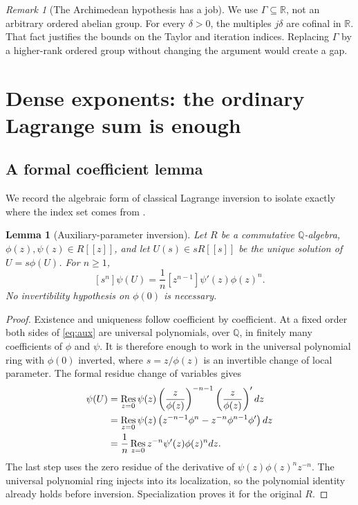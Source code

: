 \documentclass[11pt,a4paper]{article}
\newtheorem{lemma}[theorem]{Lemma}
\theoremstyle{definition}
\theoremstyle{remark}
\newtheorem{remark}[theorem]{Remark}
\newcommand{\R}{\mathbb R}
\newcommand{\Q}{\mathbb Q}
\begin{document}
\begin{remark}[The Archimedean hypothesis has a job]
We use $\Gamma\subseteq\R$, not an arbitrary ordered abelian group. For every
$\delta>0$, the multiples $j\delta$ are cofinal in $\R$. That fact justifies
the bounds on the Taylor and iteration indices. Replacing $\Gamma$ by a
higher-rank ordered group without changing the argument would create a gap.
\end{remark}

\section{Dense exponents: the ordinary Lagrange sum is enough}
\label{sec:LB}

\subsection{A formal coefficient lemma}
We record the algebraic form of classical Lagrange inversion to isolate
exactly where the index set comes from \cite{Gessel}.

\begin{lemma}[Auxiliary-parameter inversion]\label{lem:aux}
Let $R$ be a commutative $\Q$-algebra, $\phi(z),\psi(z)\in R[[z]]$, and let
$U(s)\in sR[[s]]$ be the unique solution of $U=s\phi(U)$. For $n\ge1$,
\begin{equation}\label{eq:aux}
 [s^n]\psi(U)=\frac1n[z^{n-1}]\psi'(z)\phi(z)^n.
\end{equation}
No invertibility hypothesis on $\phi(0)$ is necessary.
\end{lemma}
\begin{proof}
Existence and uniqueness follow coefficient by coefficient. At a fixed
order both sides of \eqref{eq:aux} are universal polynomials, over $\Q$, in
finitely many coefficients of $\phi$ and $\psi$. It is therefore enough to
work in the universal polynomial ring with $\phi(0)$ inverted, where
$s=z/\phi(z)$ is an invertible change of local parameter. The formal residue
change of variables gives
\begin{align*}
 [s^n]\psi(U)
 &=\mathop{\rm Res}_{z=0}
 \psi(z)\left(\frac{z}{\phi(z)}\right)^{-n-1}
 \left(\frac{z}{\phi(z)}\right)' dz\\
 &=\mathop{\rm Res}_{z=0}
 \psi(z)\left(z^{-n-1}\phi^n-z^{-n}\phi^{n-1}\phi'\right)dz\\
 &=\frac1n\mathop{\rm Res}_{z=0}z^{-n}\psi'(z)\phi(z)^n dz.
\end{align*}
The last step uses the zero residue of the derivative of
$\psi(z)\phi(z)^n z^{-n}$. The universal polynomial ring injects into its
localization, so the polynomial identity already holds before inversion.
Specialization proves it for the original $R$.
\end{proof}
\end{document}

